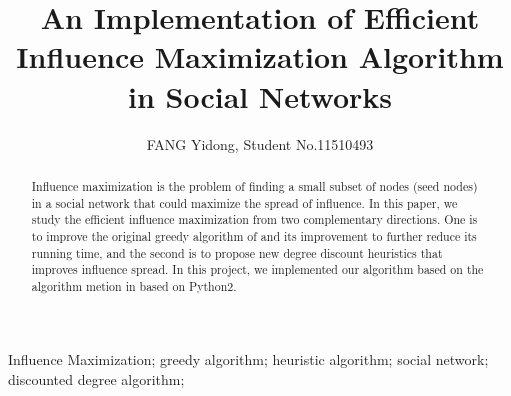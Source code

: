 \documentclass[journal,twoside,web]{ieeecolor}
\begin{document}
\title{An Implementation of Efficient Influence Maximization Algorithm in Social Networks}
\author{FANG Yidong, Student No.11510493 
}

\maketitle

\begin{abstract}
Influence maximization is the problem of finding a small subset of nodes (seed nodes) in a social network that could maximize the spread of influence. In this paper, we study the efficient influence maximization from two complementary directions. One is to improve the original greedy algorithm of \cite{Kempe2003} and its improvement \cite{Leskovec2007} to further reduce its running time, and the second is to propose new degree discount heuristics that improves influence spread. In this project, we implemented our algorithm based on the algorithm metion in \cite{Chen2009} based on Python2.
\end{abstract}

\begin{IEEEkeywords}
Influence Maximization;
greedy algorithm;
heuristic algorithm;
social network;
discounted degree algorithm;

\end{IEEEkeywords}
\end{document}
